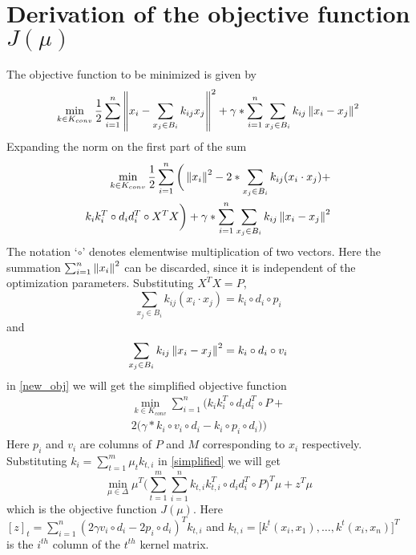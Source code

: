 \chapter{Derivation of the objective function $J(\mu)$}
\label{derivation1}
The objective function to be minimized is given by
\[ \min_{k \in K_{conv}} \frac{1}{2}\sum_{i=1}^n \left\lVert x_i - \sum_{x_j \in B_i} k_{ij}x_j\right\rVert^2 + \gamma* \sum_{i=1}^n \sum_{x_j \in B_i} k_{ij} \left\lVert x_i-x_j\right\rVert^2 \]
Expanding the norm on the first part of the sum
\begin{equation}
\begin{split}
\min_{k \in K_{conv}} \frac{1}{2}\sum_{i=1}^n \bigg(\left\lVert x_i\right\rVert^2 - 2*\sum_{x_j \in B_i} k_{ij} (x_i \cdot x_j)  + \\ k_i k_i^T \circ d_i d_i^T \circ X^TX \bigg) + \gamma* \sum_{i=1}^n \sum_{x_j \in B_i} k_{ij} \left\lVert x_i-x_j\right\rVert^2
\end{split}
\label{new_obj}
\end{equation}
The notation `$\circ$' denotes elementwise multiplication of two vectors. Here the summation $\sum_{i=1}^n \left\lVert x_i\right\rVert^2$ can be discarded, since it is independent of the optimization parameters. Substituting $X^TX = P$, 
\[\sum_{x_j \in B_i} k_{ij} (x_i \cdot x_j) = k_i \circ d_i \circ p_i\]
and 
\[ \sum_{x_j \in B_i} k_{ij} \left\lVert x_i-x_j\right\rVert^2 = k_i \circ d_i \circ v_i \]
in \ref{new_obj} we will get the simplified objective function
\begin{equation}
\begin{split}
\min_{k \in K_{conv}} \sum_{i=1}^n \bigg( k_i k_i^T \circ d_i d_i^T \circ P + \\ 2\big(\gamma*k_i \circ v_i \circ d_i - k_i \circ p_i \circ d_i\big) \bigg)
\end{split}
\label{simplified}
\end{equation}
Here $p_i$ and $v_i$ are columns of $P$ and $M$ corresponding to $x_i$ respectively. Substituting $k_i = \sum_{t=1}^m \mu_tk_{t,i}$ in \ref{simplified} we will get
\[ \min_{\mu \in \Delta} \mu^T \Bigg( \sum_{t=1}^m \sum_{i=1}^n k_{t,i}k_{t,i}^T \circ d_i d_i^T \circ P \Bigg)^T \mu + z^T \mu \]
which is the objective function $J(\mu)$. Here $[z]_t = \sum_{i=1}^n (2 \gamma v_i \circ d_i - 2 p_i \circ d_i)^T \mathit{k}_{t,i} $ and $\mathit{k}_{t,i} = \Big[ k^t(x_i, x_1), \ldots, k^t(x_i, x_n) \Big]^T $ is the $i^{th}$ column of the $t^{th}$ kernel matrix.

